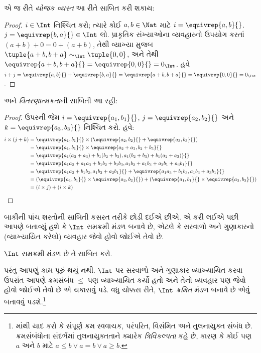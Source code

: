 \documentclass[../../../include/open-logic-section]{subfiles}
\begin{document}
એ જ રીતે \emph{યોજક વ્યસ્ત} આ રીતે સાબિત કરી શકાય:

\begin{proof}
$i \in \Int$ નિશ્ચિત કરો; ત્યારે કોઈ $a,b \in \Nat$ માટે $i =
\equivrep{a,b}{}$. $j = \equivrep{b,a}{} \in \Int$ લો. પ્રાકૃતિક
સંખ્યાઓના વ્યવહારનો ઉપયોગ કરતાં $(a+b) + 0 = 0 + (a+b)$, તેથી
વ્યાખ્યા મુજબ $\tuple{a+b, b+a} \sim_\Int \tuple{0,0}$, અને તેથી
$\equivrep{a+b, b+a}{} = \equivrep{0, 0}{} = 0_\Int$. હવે $i + j =
\equivrep{a,b}{}+\equivrep{b,a}{}=\equivrep{a+b, b+a}{}= \equivrep{0,
0}{} = 0_\Int$.
\end{proof}

અને \emph{વિતરણાત્મકતા}ની સાબિતી આ રહી:

\begin{proof}
ઉપરની જેમ $i = \equivrep{a_1, b_1}{}$, $j =
\equivrep{a_2,b_2}{}$ અને $k = \equivrep{a_3, b_3}{}$ નિશ્ચિત કરો. હવે:
\begin{align*}
	i \times (j + k)
	&= \equivrep{a_1, b_1}{} \times (\equivrep{a_2,b_2}{} + \equivrep{a_3, b_3}{})\\
	&= \equivrep{a_1, b_1}{} \times \equivrep{a_2 + a_3,b_2+b_3}{}\\
	&= \equivrep{a_1  (a_2 + a_3) + b_1  (b_2+b_3), a_1  (b_2 + b_3) + b_1 (a_2 + a_3)}{}\\
	&= \equivrep{a_1 a_2 + a_1a_3 + b_1 b_2+b_1b_3, a_1 b_2 + a_1b_3 + a_2b_1 + a_3b_1}{}\\
	&= \equivrep{a_1a_2 + b_1b_2, a_1b_2 + a_2b_1}{} + \equivrep{a_1a_3 + b_1b_3, a_1b_3 + a_3b_1}{}\\
	&= (\equivrep{a_1, b_1}{} \times \equivrep{a_2,b_2}{}) + (\equivrep{a_1, b_1}{} \times  \equivrep{a_3, b_3}{})\\
	&= (i \times j) + (i \times k)
\end{align*}
\end{proof}

બાકીની પાંચ શરતોની સાબિતી કસરત તરીકે છોડી દઈએ છીએ. એ કરી લઈએ
પછી આપણે બતાવ્યું હશે કે $\Int$ સમક્રમી મંડળ બનાવે છે, એટલે કે સરવાળો
અને ગુણાકારનો (વ્યાખ્યાયિત કરેલો) વ્યવહાર જેવો હોવો જોઈએ તેવો છે.

\begin{prob}
$\Int$ સમક્રમી મંડળ છે તે સાબિત કરો.
\end{prob}

પરંતુ આપણું કામ પૂરું થયું નથી. $\Int$ પર સરવાળો અને ગુણાકાર
વ્યાખ્યાયિત કરવા ઉપરાંત આપણે ક્રમસંબંધ $\leq$ પણ વ્યાખ્યાયિત કર્યો
હતો અને તેનો વ્યવહાર પણ જેવો હોવો જોઈએ તેવો છે એ ચકાસવું પડે. વધુ
ચોક્કસ રીતે, $\Int$ \emph{ક્રમિત} મંડળ બનાવે છે એવું બતાવવું પડશે.\footnote{
	માંથી યાદ કરો કે સંપૂર્ણ ક્રમ
	સ્વવાચક, પરંપરિત, વિસંમિત અને તુલનાયુક્ત સંબંધ છે. ક્રમસંબંધોના
	સંદર્ભમાં તુલનાયુક્તતાને ક્યારેક \emph{ત્રિવિકલ્પતા} કહે છે, કારણ કે
	કોઈ પણ $a$ અને $b$ માટે $a \leq b \lor a = b \lor a \geq b$.}
\end{document}
